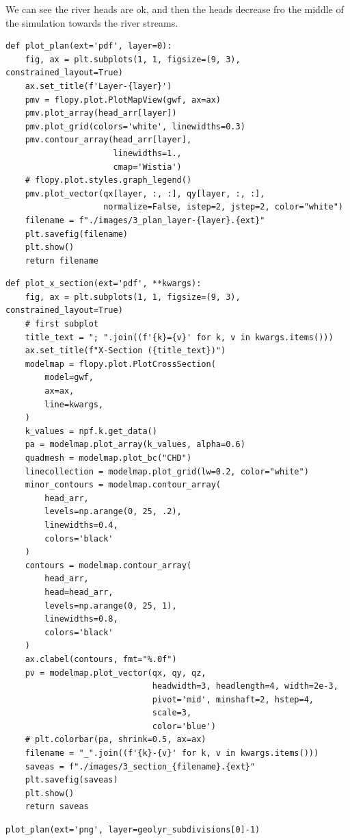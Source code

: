 \documentclass[titlepage,12pt]{unisubmission}
\begin{document}
We can see the river heads are ok, and then the heads decrease fro the middle of the simulation towards the river streams.

\begin{verbatim}
def plot_plan(ext='pdf', layer=0):
    fig, ax = plt.subplots(1, 1, figsize=(9, 3), constrained_layout=True)
    ax.set_title(f'Layer-{layer}')
    pmv = flopy.plot.PlotMapView(gwf, ax=ax)
    pmv.plot_array(head_arr[layer])
    pmv.plot_grid(colors='white', linewidths=0.3)
    pmv.contour_array(head_arr[layer],
                      linewidths=1.,
                      cmap='Wistia')
    # flopy.plot.styles.graph_legend()
    pmv.plot_vector(qx[layer, :, :], qy[layer, :, :],
                    normalize=False, istep=2, jstep=2, color="white")
    filename = f"./images/3_plan_layer-{layer}.{ext}"
    plt.savefig(filename)
    plt.show()
    return filename
\end{verbatim}


\begin{verbatim}
def plot_x_section(ext='pdf', **kwargs):
    fig, ax = plt.subplots(1, 1, figsize=(9, 3), constrained_layout=True)
    # first subplot
    title_text = "; ".join((f'{k}={v}' for k, v in kwargs.items()))
    ax.set_title(f"X-Section ({title_text})")
    modelmap = flopy.plot.PlotCrossSection(
        model=gwf,
        ax=ax,
        line=kwargs,
    )
    k_values = npf.k.get_data()
    pa = modelmap.plot_array(k_values, alpha=0.6)
    quadmesh = modelmap.plot_bc("CHD")
    linecollection = modelmap.plot_grid(lw=0.2, color="white")
    minor_contours = modelmap.contour_array(
        head_arr,
        levels=np.arange(0, 25, .2),
        linewidths=0.4,
        colors='black'
    )
    contours = modelmap.contour_array(
        head_arr,
        head=head_arr,
        levels=np.arange(0, 25, 1),
        linewidths=0.8,
        colors='black'
    )
    ax.clabel(contours, fmt="%.0f")
    pv = modelmap.plot_vector(qx, qy, qz,
                              headwidth=3, headlength=4, width=2e-3,
                              pivot='mid', minshaft=2, hstep=4,
                              scale=3,
                              color='blue')
    # plt.colorbar(pa, shrink=0.5, ax=ax)
    filename = "_".join((f'{k}-{v}' for k, v in kwargs.items()))
    saveas = f"./images/3_section_{filename}.{ext}"
    plt.savefig(saveas)
    plt.show()
    return saveas
\end{verbatim}


\begin{verbatim}
plot_plan(ext='png', layer=geolyr_subdivisions[0]-1)
\end{verbatim}
\end{document}
